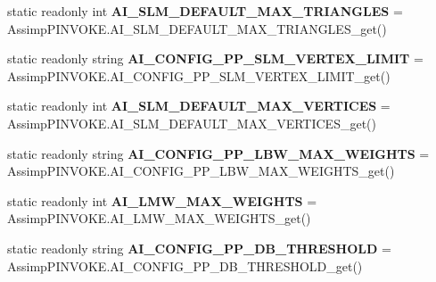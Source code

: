 \begin{DoxyCompactItemize}
\item 
\hypertarget{class_assimp_aeef468fc092148a64a81eda5320eea15}{static readonly int {\bfseries A\+I\+\_\+\+S\+L\+M\+\_\+\+D\+E\+F\+A\+U\+L\+T\+\_\+\+M\+A\+X\+\_\+\+T\+R\+I\+A\+N\+G\+L\+E\+S} = Assimp\+P\+I\+N\+V\+O\+K\+E.\+A\+I\+\_\+\+S\+L\+M\+\_\+\+D\+E\+F\+A\+U\+L\+T\+\_\+\+M\+A\+X\+\_\+\+T\+R\+I\+A\+N\+G\+L\+E\+S\+\_\+get()}\label{class_assimp_aeef468fc092148a64a81eda5320eea15}

\item 
\hypertarget{class_assimp_af12704feb560244c77298f20d0684b06}{static readonly string {\bfseries A\+I\+\_\+\+C\+O\+N\+F\+I\+G\+\_\+\+P\+P\+\_\+\+S\+L\+M\+\_\+\+V\+E\+R\+T\+E\+X\+\_\+\+L\+I\+M\+I\+T} = Assimp\+P\+I\+N\+V\+O\+K\+E.\+A\+I\+\_\+\+C\+O\+N\+F\+I\+G\+\_\+\+P\+P\+\_\+\+S\+L\+M\+\_\+\+V\+E\+R\+T\+E\+X\+\_\+\+L\+I\+M\+I\+T\+\_\+get()}\label{class_assimp_af12704feb560244c77298f20d0684b06}

\item 
\hypertarget{class_assimp_aaed10e580f13e453c6d017ffc3c4fd46}{static readonly int {\bfseries A\+I\+\_\+\+S\+L\+M\+\_\+\+D\+E\+F\+A\+U\+L\+T\+\_\+\+M\+A\+X\+\_\+\+V\+E\+R\+T\+I\+C\+E\+S} = Assimp\+P\+I\+N\+V\+O\+K\+E.\+A\+I\+\_\+\+S\+L\+M\+\_\+\+D\+E\+F\+A\+U\+L\+T\+\_\+\+M\+A\+X\+\_\+\+V\+E\+R\+T\+I\+C\+E\+S\+\_\+get()}\label{class_assimp_aaed10e580f13e453c6d017ffc3c4fd46}

\item 
\hypertarget{class_assimp_acdb07ea1c7837dbf29e1e52cdfc92638}{static readonly string {\bfseries A\+I\+\_\+\+C\+O\+N\+F\+I\+G\+\_\+\+P\+P\+\_\+\+L\+B\+W\+\_\+\+M\+A\+X\+\_\+\+W\+E\+I\+G\+H\+T\+S} = Assimp\+P\+I\+N\+V\+O\+K\+E.\+A\+I\+\_\+\+C\+O\+N\+F\+I\+G\+\_\+\+P\+P\+\_\+\+L\+B\+W\+\_\+\+M\+A\+X\+\_\+\+W\+E\+I\+G\+H\+T\+S\+\_\+get()}\label{class_assimp_acdb07ea1c7837dbf29e1e52cdfc92638}

\item 
\hypertarget{class_assimp_a54ac5acc29ea65b6f0fc9590ef3a48bf}{static readonly int {\bfseries A\+I\+\_\+\+L\+M\+W\+\_\+\+M\+A\+X\+\_\+\+W\+E\+I\+G\+H\+T\+S} = Assimp\+P\+I\+N\+V\+O\+K\+E.\+A\+I\+\_\+\+L\+M\+W\+\_\+\+M\+A\+X\+\_\+\+W\+E\+I\+G\+H\+T\+S\+\_\+get()}\label{class_assimp_a54ac5acc29ea65b6f0fc9590ef3a48bf}

\item 
\hypertarget{class_assimp_a78f539c9cab62c15b45ad63ac037c208}{static readonly string {\bfseries A\+I\+\_\+\+C\+O\+N\+F\+I\+G\+\_\+\+P\+P\+\_\+\+D\+B\+\_\+\+T\+H\+R\+E\+S\+H\+O\+L\+D} = Assimp\+P\+I\+N\+V\+O\+K\+E.\+A\+I\+\_\+\+C\+O\+N\+F\+I\+G\+\_\+\+P\+P\+\_\+\+D\+B\+\_\+\+T\+H\+R\+E\+S\+H\+O\+L\+D\+\_\+get()}\label{class_assimp_a78f539c9cab62c15b45ad63ac037c208}


\end{DoxyCompactItemize}
